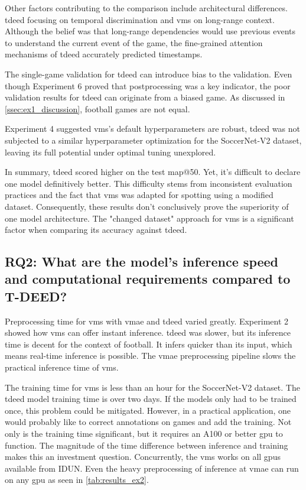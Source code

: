 Other factors contributing to the comparison include architectural differences. \acrshort{tdeed} focusing on temporal discrimination and \acrshort{vms} on long-range context. Although the belief was that long-range dependencies would use previous events to understand the current event of the game, the fine-grained attention mechanisms of \acrshort{tdeed} accurately predicted timestamps. 

The single-game validation for \acrshort{tdeed} can introduce bias to the validation. Even though Experiment 6 proved that postprocessing was a key indicator, the poor validation results for \acrshort{tdeed} can originate from a biased game. As discussed in \cref{ssec:ex1_discussion}, football games are not equal. 

Experiment 4 suggested \acrshort{vms}'s default hyperparameters are robust, \acrshort{tdeed} was not subjected to a similar hyperparameter optimization for the SoccerNet-V2 dataset, leaving its full potential under optimal tuning unexplored.

In summary, \acrshort{tdeed} scored higher on the test \acrshort{map}@50. Yet, it's difficult to declare one model definitively better. This difficulty stems from inconsistent evaluation practices and the fact that \acrshort{vms} was adapted for spotting using a modified dataset. Consequently, these results don't conclusively prove the superiority of one model architecture. The "changed dataset" approach for \acrshort{vms} is a significant factor when comparing its accuracy against \acrshort{tdeed}.


\subsection{RQ2: What are the model’s inference speed and computational requirements compared to T-DEED?}

Preprocessing time for \acrshort{vms} with \acrshort{vmae} and \acrshort{tdeed} varied greatly. Experiment 2 showed how \acrshort{vms} can offer instant inference. \acrshort{tdeed} was slower, but its inference time is decent for the context of football. It infers quicker than its input, which means real-time inference is possible. The \acrshort{vmae} preprocessing pipeline slows the practical inference time of \acrshort{vms}. 

The training time for \acrshort{vms} is less than an hour for the SoccerNet-V2 dataset. The \acrshort{tdeed} model training time is over two days. If the models only had to be trained once, this problem could be mitigated. However, in a practical application, one would probably like to correct annotations on games and add the training. Not only is the training time significant, but it requires an A100 or better \acrshort{gpu} to function. The magnitude of the time difference between inference and training makes this an investment question. Concurrently, the \acrshort{vms} works on all \acrshort{gpu}s available from IDUN. Even the heavy preprocessing of inference at \acrshort{vmae} can run on any \acrshort{gpu} as seen in \cref{tab:results_ex2}.

